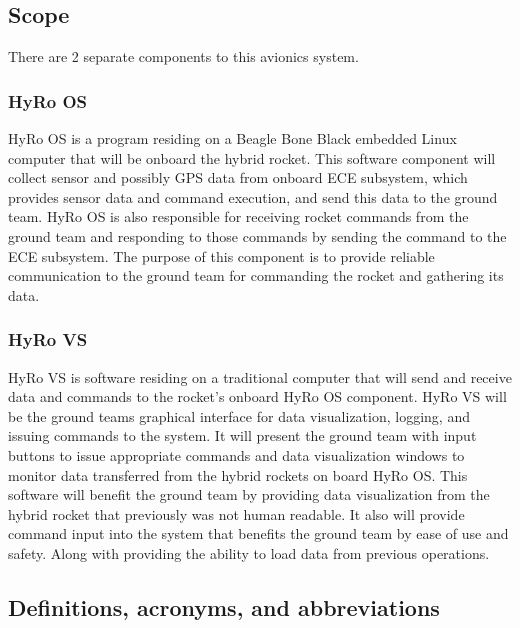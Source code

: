 \documentclass[10pt,draftclsnofoot,onecolumn,compsoc]{IEEEtran}
\begin{document}
\subsection{Scope}
 There are 2 separate components to this avionics system. 

\subsubsection{HyRo OS}
HyRo OS is a program residing on a Beagle Bone Black embedded Linux computer that will be onboard the hybrid rocket. This software component will collect sensor and possibly GPS data from onboard ECE subsystem, which provides sensor data and command execution, and send this data to the ground team. HyRo OS is also responsible for receiving rocket commands from the ground team and responding to those commands by sending the command to the ECE subsystem. The purpose of this component is to provide reliable communication to the ground team for commanding the rocket and gathering its data.  \par

\subsubsection{HyRo VS}
HyRo VS is software residing on a traditional computer that will send and receive data and commands to the rocket's onboard HyRo OS component. HyRo VS will be the ground teams graphical interface for data visualization, logging, and issuing commands to the system. It will present the ground team with input buttons to issue appropriate commands and data visualization windows to monitor data transferred from the hybrid rockets on board HyRo OS. This software will benefit the ground team by providing data visualization from the hybrid rocket that previously was not human readable. It also will provide command input into the system that benefits the ground team by ease of use and safety. Along with providing the ability to load data from previous operations.

\subsection{Definitions, acronyms, and abbreviations}
\end{document}
